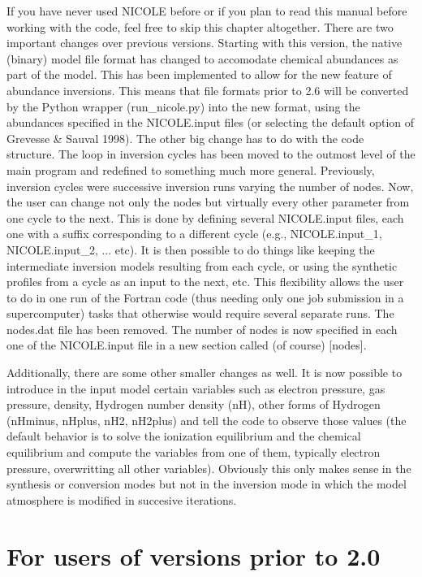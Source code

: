 If you have never used NICOLE before or if you plan to read this
manual before working with the code, feel free to skip this chapter
altogether.  There are two important changes over previous
versions. Starting with this version, the native (binary) model file
format has changed to accomodate chemical abundances as part of the
model. This has been implemented to allow for the new feature of
abundance inversions. This means that file formats prior to 2.6 will
be converted by the Python wrapper (run\_nicole.py) into the new
format, using the abundances specified in the NICOLE.input files (or
selecting the default option of Grevesse \& Sauval 1998). The other
big change has to do with the code structure. The loop in inversion
cycles has been moved to the outmost level of the main program and
redefined to something much more general. Previously, inversion cycles
were successive inversion runs varying the number of nodes. Now, the
user can change not only the nodes but virtually every other parameter
from one cycle to the next. This is done by defining several
NICOLE.input files, each one with a suffix corresponding to a
different cycle (e.g., NICOLE.input\_1, NICOLE.input\_2, ... etc). It
is then possible to do things like keeping the intermediate inversion
models resulting from each cycle, or using the synthetic profiles from
a cycle as an input to the next, etc. This flexibility allows the user
to do in one run of the Fortran code (thus needing only one job
submission in a supercomputer) tasks that otherwise would require
several separate runs. The nodes.dat file has been removed. The number
of nodes is now specified in each one of the NICOLE.input file in a
new section called (of course) [nodes].

Additionally, there are some other smaller changes as well. It is now
possible to introduce in the input model certain variables such as
electron pressure, gas pressure, density, Hydrogen number density
(nH), other forms of Hydrogen (nHminus, nHplus, nH2, nH2plus) and
tell the code to observe those values (the default behavior is to solve
the ionization equilibrium and the chemical equilibrium and compute
the variables from one of them, typically electron pressure,
overwritting all other variables). Obviously this only makes sense in
the synthesis or conversion modes but not in the inversion mode in
which the model atmosphere is modified in succesive iterations.

\section{For users of versions prior to 2.0}

